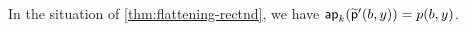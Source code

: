 \documentclass[hott-all.tex]{subfiles}
\begin{document}
% 
% 
\begin{lem}
  In the situation of \cref{thm:flattening-rectnd}, we have $\mathsf{ap}_{k}(\widetilde{\mathsf{p}}'(b,y)) = p(b,y)$.
\end{lem}
% 
\end{document}
